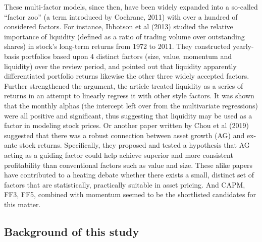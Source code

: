 These multi-factor models, since then, have been widely expanded into a so-called “factor zoo” (a term introduced by Cochrane, 2011) with over a hundred of considered factors. For instance, Ibbotson et al (2013) studied the relative importance of liquidity (defined as a ratio of trading volume over outstanding shares) in stock’s long-term returns from 1972 to 2011. They constructed yearly-basis portfolios based upon 4 distinct factors (size, value, momentum and liquidity) over the review period, and pointed out that liquidity apparently differentiated portfolio returns likewise the other three widely accepted factors. Further strengthened the argument, the article treated liquidity as a series of returns in an attempt to linearly regress it with other style factors. It was shown that the monthly alphas (the intercept left over from the multivariate regressions) were all positive and significant, thus suggesting that liquidity may be used as a factor in modeling stock prices. Or another paper written by Chou et al (2019) suggested that there was a robust connection between asset growth (AG) and ex-ante stock returns. Specifically, they proposed and tested a hypothesis that AG acting as a guiding factor could help achieve superior and more consistent profitability than conventional factors such as value and size. These alike papers have contributed to a heating debate whether there exists a small, distinct set of factors that are statistically, practically suitable in asset pricing. And CAPM, FF3, FF5, combined with momentum seemed to be the shortlisted candidates for this matter.

\subsection{Background of this study}
